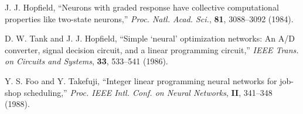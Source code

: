 \documentclass[11pt,twoside]{article}
\def\labart{yourLabel}      %
\begin{document}
\begin{multicols}{2}

\begin{thebibliography}{000}
J. J. Hopfield, ``Neurons with graded response have collective
computational properties like two-state neurons,'' {\it Proc. Natl. Acad. Sci.},
{\bf 81}, 3088--3092 (1984).

D. W. Tank and J. J. Hopfield, ``Simple `neural' optimization networks:
An A/D converter, signal decision circuit, and a linear programming circuit,''
{\it IEEE Trans. on Circuits and Systems}, {\bf 33}, 533--541 (1986).

Y. S. Foo and Y. Takefuji, ``Integer linear programming neural networks for
job-shop scheduling,'' {\it Proc. IEEE Intl. Conf. on Neural Networks},
{\bf II}, 341--348 (1988).
\label{\labart-LastPage}
\end{thebibliography}
\end{multicols}
\end{document}
